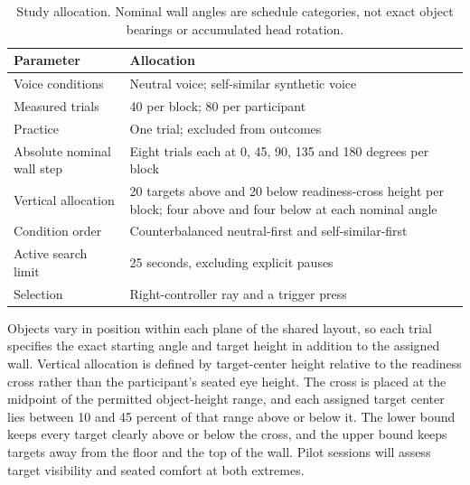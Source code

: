 \begin{table}[htbp]\centering
\caption[Study allocation]{Study allocation. Nominal wall angles are schedule categories, not exact object bearings or accumulated head rotation.}
\begin{tabularx}{\linewidth}{@{}lX@{}}\toprule
Parameter & Allocation \\\midrule
Voice conditions & Neutral voice; self-similar synthetic voice \\
Measured trials & 40 per block; 80 per participant \\
Practice & One trial; excluded from outcomes \\
Absolute nominal wall step & Eight trials each at 0, 45, 90, 135 and 180 degrees per block \\
Vertical allocation & 20 targets above and 20 below readiness-cross height per block; four above and four below at each nominal angle \\
Condition order & Counterbalanced neutral-first and self-similar-first \\
Active search limit & 25 seconds, excluding explicit pauses \\
Selection & Right-controller ray and a trigger press \\\bottomrule
\end{tabularx}
\end{table}

Objects vary in position within each plane of the shared layout, so each trial specifies the exact starting angle and target height in addition to the assigned wall. Vertical allocation is defined by target-center height relative to the readiness cross rather than the participant's seated eye height. The cross is placed at the midpoint of the permitted object-height range, and each assigned target center lies between 10 and 45 percent of that range above or below it. The lower bound keeps every target clearly above or below the cross, and the upper bound keeps targets away from the floor and the top of the wall. Pilot sessions will assess target visibility and seated comfort at both extremes.

